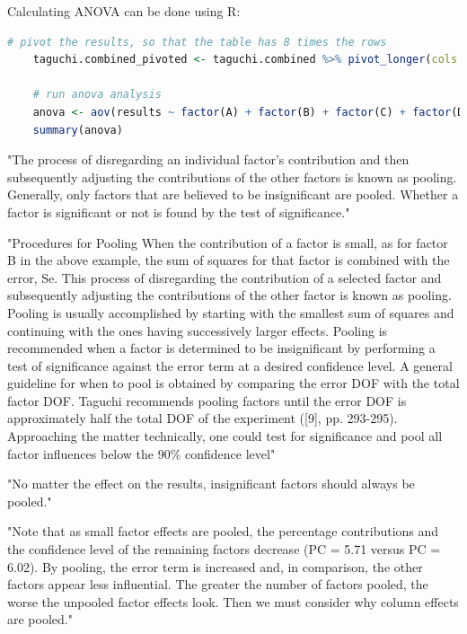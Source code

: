 Calculating ANOVA can be done using R: 
\begin{lstlisting}[language=R]
	# pivot the results, so that the table has 8 times the rows
	taguchi.combined_pivoted <- taguchi.combined %>% pivot_longer(cols = starts_with("min_"), values_to = "results")
	
	# run anova analysis
	anova <- aov(results ~ factor(A) + factor(B) + factor(C) + factor(D) * factor(E) + factor(F) * factor(G), data = taguchi.combined_pivoted)
	summary(anova)
\end{lstlisting}

"The process of disregarding an individual factor’s contribution and then subsequently adjusting the contributions of the other factors is known as pooling. Generally, only factors that are believed to be insignificant are pooled. Whether a factor is significant or not is found by the test of significance." \cite{roy_primer_1990}

"Procedures for Pooling When the contribution of a factor is small, as for factor B in the above example, the sum of squares for that factor is combined with the error, Se. This process of disregarding the contribution of a selected factor and subsequently adjusting the contributions of the other factor is known as pooling. Pooling is usually accomplished by starting with the smallest sum of squares and continuing with the ones having successively larger effects. Pooling is recommended when a factor is determined to be insignificant by performing a test of significance against the error term at a desired confidence level. A general guideline for when to pool is obtained by comparing the error DOF with the total factor DOF. Taguchi recommends pooling factors until the error DOF is approximately half the total DOF of the experiment ([9], pp. 293-295). Approaching the matter technically, one could test for significance and pool all factor influences below the 90\% confidence level"\cite{roy_primer_1990}

"No matter the effect on the results, insignificant factors should always be pooled."\cite{roy_primer_1990}

"Note that as small factor effects are pooled, the percentage contributions and the confidence level of the remaining factors decrease (PC = 5.71 versus PC = 6.02). By pooling, the error term is increased and, in comparison, the other factors appear less influential. The greater the number of factors pooled, the worse the unpooled factor effects look. Then we must consider why column effects are pooled."\cite{roy_primer_1990}

